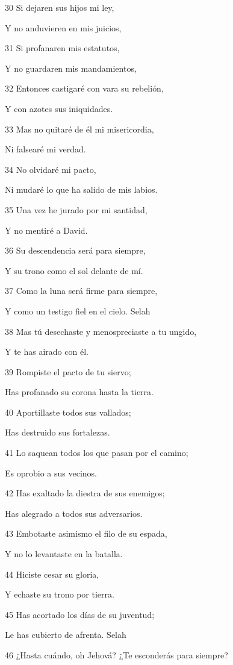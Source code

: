 \par 30 Si dejaren sus hijos mi ley,
\par Y no anduvieren en mis juicios,
\par 31 Si profanaren mis estatutos,
\par Y no guardaren mis mandamientos,
\par 32 Entonces castigaré con vara su rebelión,
\par Y con azotes sus iniquidades.
\par 33 Mas no quitaré de él mi misericordia,
\par Ni falsearé mi verdad.
\par 34 No olvidaré mi pacto,
\par Ni mudaré lo que ha salido de mis labios.
\par 35 Una vez he jurado por mi santidad,
\par Y no mentiré a David.
\par 36 Su descendencia será para siempre,
\par Y su trono como el sol delante de mí.
\par 37 Como la luna será firme para siempre,
\par Y como un testigo fiel en el cielo. Selah
\par 38 Mas tú desechaste y menospreciaste a tu ungido,
\par Y te has airado con él.
\par 39 Rompiste el pacto de tu siervo;
\par Has profanado su corona hasta la tierra.
\par 40 Aportillaste todos sus vallados;
\par Has destruido sus fortalezas.
\par 41 Lo saquean todos los que pasan por el camino;
\par Es oprobio a sus vecinos.
\par 42 Has exaltado la diestra de sus enemigos;
\par Has alegrado a todos sus adversarios.
\par 43 Embotaste asimismo el filo de su espada,
\par Y no lo levantaste en la batalla.
\par 44 Hiciste cesar su gloria,
\par Y echaste su trono por tierra.
\par 45 Has acortado los días de su juventud;
\par Le has cubierto de afrenta. Selah
\par 46 ¿Hasta cuándo, oh Jehová? ¿Te esconderás para siempre?
